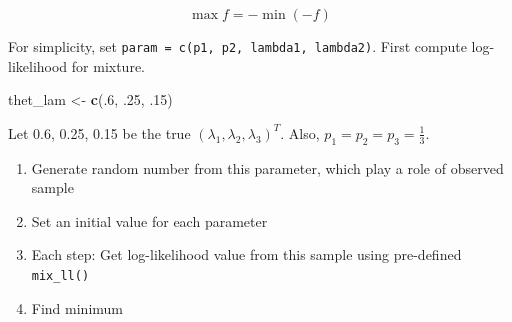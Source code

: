 \documentclass[]{book}
\newenvironment{Shaded}{\begin{snugshade}}{\end{snugshade}}
\newcommand{\CommentTok}[1]{\textcolor[rgb]{0.56,0.35,0.01}{\textit{#1}}}
\newcommand{\ControlFlowTok}[1]{\textcolor[rgb]{0.13,0.29,0.53}{\textbf{#1}}}
\newcommand{\DataTypeTok}[1]{\textcolor[rgb]{0.13,0.29,0.53}{#1}}
\newcommand{\DecValTok}[1]{\textcolor[rgb]{0.00,0.00,0.81}{#1}}
\newcommand{\FloatTok}[1]{\textcolor[rgb]{0.00,0.00,0.81}{#1}}
\newcommand{\KeywordTok}[1]{\textcolor[rgb]{0.13,0.29,0.53}{\textbf{#1}}}
\newcommand{\NormalTok}[1]{#1}
\newcommand{\OperatorTok}[1]{\textcolor[rgb]{0.81,0.36,0.00}{\textbf{#1}}}
\newcommand{\StringTok}[1]{\textcolor[rgb]{0.31,0.60,0.02}{#1}}
\providecommand{\tightlist}{%
  \setlength{\itemsep}{0pt}\setlength{\parskip}{0pt}}
\theoremstyle{definition}
\theoremstyle{definition}
\theoremstyle{definition}
\theoremstyle{remark}
\begin{document}
\[\max f = - \min ( - f)\]

For simplicity, set \texttt{param\ =\ c(p1,\ p2,\ lambda1,\ lambda2)}. First compute log-likelihood for mixture.

\begin{Shaded}
\end{Shaded}

\begin{Shaded}
\begin{Highlighting}[]
\NormalTok{thet_lam <-}\StringTok{ }\KeywordTok{c}\NormalTok{(.}\DecValTok{6}\NormalTok{, }\FloatTok{.25}\NormalTok{, }\FloatTok{.15}\NormalTok{)}
\end{Highlighting}
\end{Shaded}

Let 0.6, 0.25, 0.15 be the true \((\lambda_1, \lambda_2, \lambda_3)^T\). Also, \(p_1 = p_2 = p_3 = \frac{1}{3}\).

\begin{enumerate}
\def\labelenumi{\arabic{enumi}.}
\tightlist
\item
  Generate random number from this parameter, which play a role of observed sample
\item
  Set an initial value for each parameter
\item
  Each step: Get log-likelihood value from this sample using pre-defined \texttt{mix\_ll()}
\item
  Find minimum
\end{enumerate}
\end{document}
